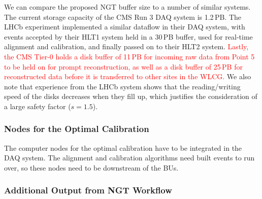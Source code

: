 We can compare the proposed NGT buffer size to a number of similar systems.
The current storage capacity of the CMS Run 3 DAQ system is 1.2\,PB.
The LHCb experiment implemented a similar dataflow in their DAQ system, 
with events accepted by their HLT1 system held in a 30\,PB buffer,
used for real-time alignment and calibration,
and finally passed on to their HLT2 system.
\textcolor{red}{Lastly, the CMS Tier-0 holds a disk buffer of 11\,PB for incoming raw data from Point 5 to be held on for prompt reconstruction,
as well as a disk buffer of 25\,PB for reconstructed data before it is transferred to other sites in the WLCG.}
We also note that experience from the LHCb system shows that the reading/writing speed of the disks decreases when they fill up,
which justifies the consideration of a large safety factor ($s = 1.5$).

\subsubsection{Nodes for the Optimal Calibration}

The computer nodes for the optimal calibration have to be integrated in the DAQ system.
The alignment and calibration algorithms need built events to run over, so these nodes need to be downstream of the BUs.

\subsubsection{Additional Output from NGT Workflow}




